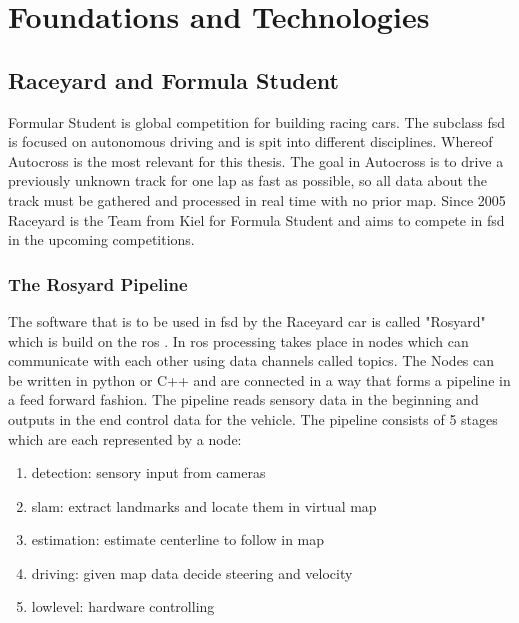 

\graphicspath{{Chapter/Figs/FoundationsAndTechnologies/}}
\chapter{Foundations and Technologies}

\section{Raceyard and Formula Student}
Formular Student is global competition for building racing cars. The subclass \ac{fsd} is focused on autonomous driving and is spit into different disciplines. Whereof Autocross is the most relevant for this thesis. The goal in Autocross is to drive a previously unknown track for one lap as fast as possible, so all data about the track must be gathered and processed in real time with no prior map.
Since 2005 Raceyard is the Team from Kiel for Formula Student and aims to compete in \ac{fsd} in the upcoming competitions.


\subsection{The Rosyard Pipeline}
The software that is to be used in \ac{fsd} by the Raceyard car is called "Rosyard" which is build on the \ac{ros} \cite{ros}.
In \ac{ros} processing takes place in nodes which can communicate with each other using data channels called topics. The Nodes can be written in python or C++ and are connected in a way that forms a pipeline in a feed forward fashion. The pipeline reads sensory data in the beginning and outputs in the end control data for the vehicle. The pipeline consists of 5 stages which are each represented by a node:
\begin{enumerate}
    \item detection: sensory input from cameras
    \item slam: extract landmarks and locate them in virtual map
    \item estimation: estimate centerline to follow in map
    \item driving: given map data decide steering and velocity
    \item lowlevel: hardware controlling
\end{enumerate}

